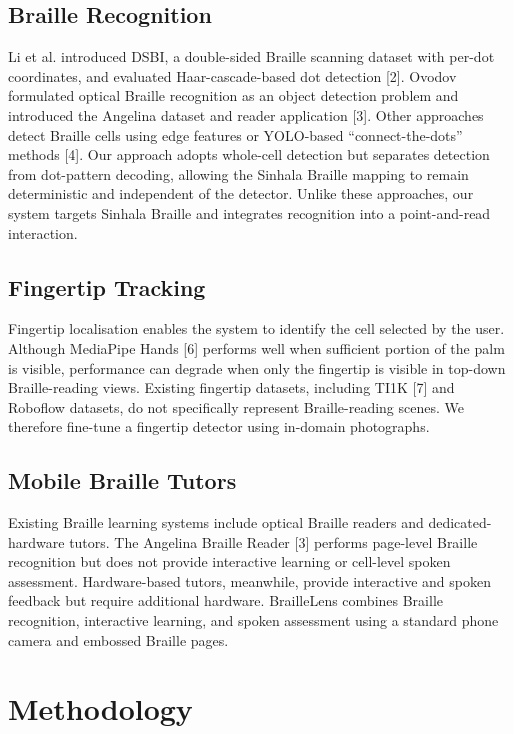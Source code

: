 \documentclass{article}
\begin{document}
\subsection*{Braille Recognition}

Li et al. introduced DSBI, a double-sided Braille scanning dataset with per-dot coordinates, and evaluated Haar-cascade-based dot detection [2]. Ovodov formulated optical Braille recognition as an object detection problem and introduced the Angelina dataset and reader application [3]. Other approaches detect Braille cells using edge features or YOLO-based ``connect-the-dots'' methods [4]. Our approach adopts whole-cell detection but separates detection from dot-pattern decoding, allowing the Sinhala Braille mapping to remain deterministic and independent of the detector. Unlike these approaches, our system targets Sinhala Braille and integrates recognition into a point-and-read interaction.

\subsection*{Fingertip Tracking}

Fingertip localisation enables the system to identify the cell selected by the user. Although MediaPipe Hands [6] performs well when sufficient portion of the palm is visible, performance can degrade when only the fingertip is visible in top-down Braille-reading views. Existing fingertip datasets, including TI1K [7] and Roboflow datasets, do not specifically represent Braille-reading scenes. We therefore fine-tune a fingertip detector using in-domain photographs.

\subsection*{Mobile Braille Tutors}

Existing Braille learning systems include optical Braille readers and dedicated-hardware tutors. The Angelina Braille Reader [3] performs page-level Braille recognition but does not provide interactive learning or cell-level spoken assessment. Hardware-based tutors, meanwhile, provide interactive and spoken feedback but require additional hardware. BrailleLens combines Braille recognition, interactive learning, and spoken assessment using a standard phone camera and embossed Braille pages.
\section{Methodology}
\end{document}
